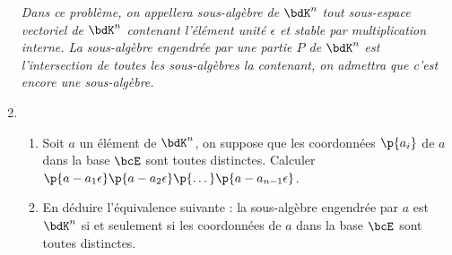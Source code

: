 \documentclass[a4paper,french,bookmarks]{article}
\begin{document}
\begin{enumerate}
        \textit{Dans ce problème, on appellera sous-algèbre de $\bdK^n$ tout sous-espace vectoriel de $\bdK^n$ contenant l'élément unité $\epsilon$ et stable par multiplication interne. La sous-algèbre engendrée par une partie $P$ de $\bdK^n$ est l'intersection de toutes les sous-algèbres la contenant, on admettra que c'est encore une sous-algèbre.}
        
        \item \begin{enumerate}
            \item Soit $a$ un élément de $\bdK^n$, on suppose que les coordonnées $\p{a_i}$ de $a$ dans la base $\bcE$ sont toutes distinctes. Calculer $\p{a - a_1\epsilon}\p{a - a_2\epsilon}\p{\dots}\p{a - a_{n-1}\epsilon}$.
            
            \noafter
            \nobefore\yesafter
            \boxansconc{
                \[ \p{a - a_1\epsilon}\p{a - a_2\epsilon}\p{\dots}\p{a - a_{n-1}\epsilon} = \p{\prod_{i=1}^{n-1} a_n - a_i}e_n \neq 0 \]
            }
            \yesbefore
            
            \item En déduire l'équivalence suivante : la sous-algèbre engendrée par $a$ est $\bdK^n$ si et seulement si les coordonnées de $a$ dans la base $\bcE$ sont toutes distinctes.
            
            \noafter
\end{enumerate}
\end{enumerate}
\end{document}
